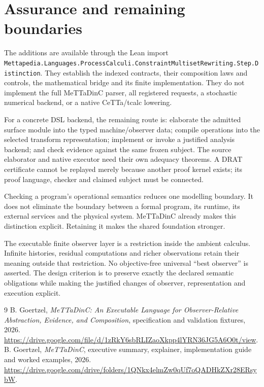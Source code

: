 \documentclass[11pt]{article}
\newcommand{\lean}[1]{\nolinkurl{#1}}
\begin{document}
\section{Assurance and remaining boundaries}
The additions are available through the Lean import
\lean{Mettapedia.Languages.ProcessCalculi.ConstraintMultisetRewriting.Step.Distinction}.
They establish the indexed contracts, their composition laws and controls,
the mathematical bridge and its finite implementation. They do
not implement the full MeTTaDinC parser, all registered requests, a stochastic
numerical backend, or a native CeTTa/tcalc lowering.

For a concrete DSL backend, the remaining route is: elaborate the admitted
surface module into the typed machine/observer data; compile operations into
the selected transform representation; implement or invoke a justified
analysis backend; and check evidence against the same frozen subject.
The source elaborator and native executor need their own adequacy theorems.
A DRAT certificate cannot be replayed merely because another proof kernel
exists; its proof language, checker and claimed subject must be connected.

Checking a program's operational semantics reduces one modelling boundary.
It does not eliminate the boundary between a formal program, its runtime,
its external services and the physical system. MeTTaDinC already makes this
distinction explicit. Retaining it makes the shared foundation stronger.

The executable finite observer layer is a restriction inside the ambient
calculus. Infinite histories, residual computations and richer observations
retain their meaning outside that restriction. No objective-free universal
``best observer'' is asserted. The design criterion is to preserve exactly
the declared semantic obligations while making the justified changes of
observer, representation and execution explicit.

\begin{thebibliography}{9}
 B. Goertzel, \emph{MeTTaDinC: An Executable Language for
Observer-Relative Abstraction, Evidence, and Composition}, specification and
validation fixtures, 2026.
\url{https://drive.google.com/file/d/1zRkY6sbRLIZaoXkpp4lYRN36JG5A6O0t/view}.
 B. Goertzel, \emph{MeTTaDinC}, executive summary, explainer,
implementation guide and worked examples, 2026.
\url{https://drive.google.com/drive/folders/1QNkx4elmZw0qUf7oQADHkZXr28ERsybW}.
\end{thebibliography}
\end{document}
